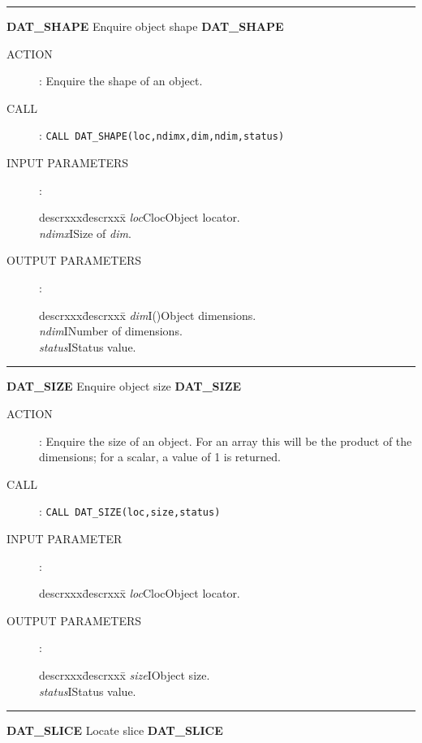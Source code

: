 \goodbreak
\rule{\textwidth}{0.3mm}
{\Large {\bf DAT\_SHAPE} \hfill Enquire object shape \hfill {\bf DAT\_SHAPE}}
\begin{description}
\item [ACTION]:
Enquire the shape of an object.
\item [CALL]:
{\tt CALL DAT\_SHAPE(loc,ndimx,dim,ndim,status)}
\item [INPUT PARAMETERS]:
\begin{tabbing}
descrxxx\=descrxxx\=\kill
{\em loc}\>Cloc\>Object locator.\\
{\em ndimx}\>I\>Size of {\em dim}.
\end{tabbing}
\item [OUTPUT PARAMETERS]:
\begin{tabbing}
descrxxx\=descrxxx\=\kill
{\em dim}\>I()\>Object dimensions.\\
{\em ndim}\>I\>Number of dimensions.\\
{\em status}\>I\>Status value.
\end{tabbing}
\end{description}
\goodbreak
\rule{\textwidth}{0.3mm}
{\Large {\bf DAT\_SIZE} \hfill Enquire object size \hfill {\bf DAT\_SIZE}}
\begin{description}
\item [ACTION]:
Enquire the size of an object.
For an array this will be the product of the dimensions; for a scalar, a
value of 1 is returned.
\item [CALL]:
{\tt CALL DAT\_SIZE(loc,size,status)}
\item [INPUT PARAMETER]:
\begin{tabbing}
descrxxx\=descrxxx\=\kill
{\em loc}\>Cloc\>Object locator.
\end{tabbing}
\item [OUTPUT PARAMETERS]:
\begin{tabbing}
descrxxx\=descrxxx\=\kill
{\em size}\>I\>Object size.\\
{\em status}\>I\>Status value.
\end{tabbing}
\end{description}
\goodbreak
\rule{\textwidth}{0.3mm}
{\Large {\bf DAT\_SLICE} \hfill Locate slice \hfill {\bf DAT\_SLICE}}
